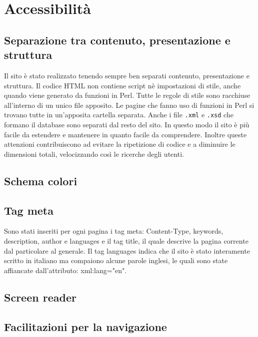 \documentclass{article}
\begin{document}

\section{Accessibilità}

\subsection{Separazione tra contenuto, presentazione e struttura}
	Il sito è stato realizzato tenendo sempre ben separati contenuto, presentazione e struttura.
	Il codice HTML non contiene script nè impostazioni di stile, anche quando viene generato da funzioni in Perl.
	Tutte le regole di stile sono racchiuse all'interno di un unico file apposito.
	Le pagine che fanno uso di funzioni in Perl si trovano tutte in un'apposita cartella separata.
	Anche i file \texttt{.xml} e \texttt{.xsd} che formano il database sono separati dal resto del sito.
	In questo modo il sito è più facile da estendere e mantenere in quanto facile da comprendere.
	Inoltre queste attenzioni contribuiscono ad evitare la ripetizione di codice e a diminuire le dimensioni totali,
	velocizzando così le ricerche degli utenti.

\subsection{Schema colori}

\subsection{Tag meta}
	Sono stati inseriti per ogni pagina i tag meta: Content-Type, keywords, description, author e languages e il tag title, 
	il quale descrive la pagina corrente dal particolare al generale. 
	Il tag languages indica che il sito è stato interamente scritto in italiano ma compaiono alcune parole inglesi, 
	le quali sono state affiancate dall'attributo: xml:lang="en".

\subsection{Screen reader}

\subsection{Facilitazioni per la navigazione}
\end{document}
